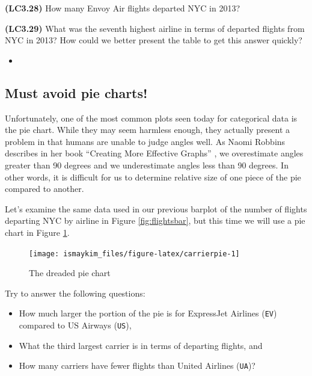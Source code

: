 \documentclass[12pt, krantz2,]{krantz}
\providecommand{\tightlist}{%
  \setlength{\itemsep}{0pt}\setlength{\parskip}{0pt}}
\newenvironment{rmdblock}[1]
  {\begin{shaded*}
  \begin{itemize}
  \renewcommand{\labelitemi}{
    \raisebox{-.7\height}[0pt][0pt]{
    }
  }
  \item
  }
  {
  \end{itemize}
  \end{shaded*}
  }
\newenvironment{learncheck}
  {\begin{rmdblock}{warning}}
  {\end{rmdblock}}
\begin{document}
\textbf{(LC3.28)} How many Envoy Air flights departed NYC in 2013?

\textbf{(LC3.29)} What was the seventh highest airline in terms of departed flights from NYC in 2013? How could we better present the table to get this answer quickly?

\begin{learncheck}

\end{learncheck}

\hypertarget{must-avoid-pie-charts}{%
\subsection{Must avoid pie charts!}\label{must-avoid-pie-charts}}

Unfortunately, one of the most common plots seen today for categorical data is the pie chart. While they may seem harmless enough, they actually present a problem in that humans are unable to judge angles well. As Naomi Robbins describes in her book ``Creating More Effective Graphs'' \citep{robbins2013}, we overestimate angles greater than 90 degrees and we underestimate angles less than 90 degrees. In other words, it is difficult for us to determine relative size of one piece of the pie compared to another.

Let's examine the same data used in our previous barplot of the number of flights departing NYC by airline in Figure \ref{fig:flightsbar}, but this time we will use a pie chart in Figure \ref{fig:carrierpie}.

\begin{figure}

{\centering \texttt{[image: ismaykim\_files/figure-latex/carrierpie-1]} 

}

\caption{The dreaded pie chart}\label{fig:carrierpie}
\end{figure}

Try to answer the following questions:

\begin{itemize}
\tightlist
\item
  How much larger the portion of the pie is for ExpressJet Airlines (\texttt{EV}) compared to US Airways (\texttt{US}),
\item
  What the third largest carrier is in terms of departing flights, and
\item
  How many carriers have fewer flights than United Airlines (\texttt{UA})?
\end{itemize}
\end{document}
